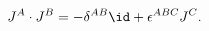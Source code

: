 \begin{equation}
   J^{A}\cdot J^{B}=-\delta^{AB}\id +\epsilon^{ABC}J^{C} .
\label{Spstruc}
\end{equation}

